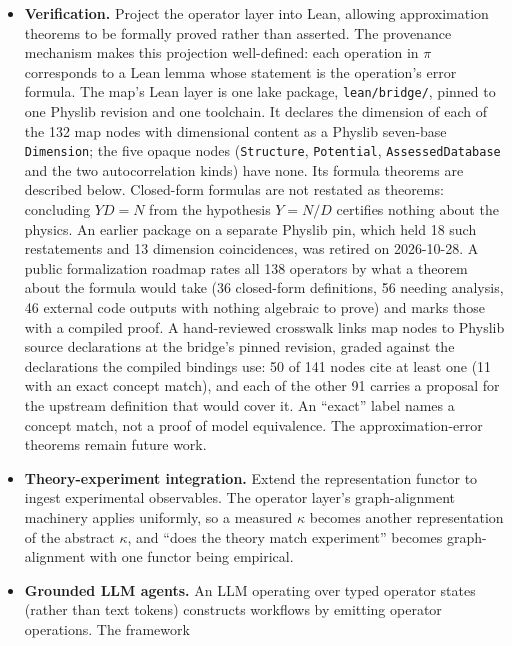 \documentclass[11pt,a4paper]{article}
\begin{document}
\begin{itemize}[leftmargin=2em]
  \item \textbf{Verification.} Project the operator layer into Lean, allowing
        approximation theorems to be formally proved rather than asserted. The
        provenance mechanism makes this projection well-defined: each operation in $\pi$
        corresponds to a Lean lemma whose statement is the operation's error formula.
        The map's Lean layer is one lake package, \texttt{lean/bridge/}, pinned to
        one Physlib revision and one toolchain. It declares the dimension of each of
        the 132 map nodes with dimensional content as a Physlib seven-base
        \texttt{Dimension}; the five opaque nodes (\texttt{Structure},
        \texttt{Potential}, \texttt{AssessedDatabase} and the two autocorrelation
        kinds) have none. Its formula theorems are described below. Closed-form
        formulas are not restated as theorems: concluding $YD = N$ from the
        hypothesis $Y = N/D$ certifies nothing about the physics. An earlier package
        on a separate Physlib pin, which held 18 such restatements and 13 dimension
        coincidences, was retired on 2026-10-28. A public formalization roadmap rates
        all 138 operators by what a theorem about the formula would take (36
        closed-form definitions, 56 needing analysis, 46 external code outputs with
        nothing algebraic to prove) and marks those with a compiled proof. A
        hand-reviewed crosswalk links map nodes to Physlib source declarations
        at the bridge's pinned revision, graded against the declarations the
        compiled bindings use: 50 of 141 nodes cite at least one (11 with an
        exact concept match), and each of the other 91 carries a proposal for
        the upstream definition that would cover it. An ``exact'' label names a
        concept match, not a proof of model equivalence. The
        approximation-error theorems remain future work.
  \item \textbf{Theory-experiment integration.} Extend the representation functor to ingest
        experimental observables. The operator layer's graph-alignment machinery applies uniformly,
        so a measured $\kappa$ becomes another representation of the abstract $\kappa$, and
        ``does the theory match experiment'' becomes graph-alignment with one functor being
        empirical.
  \item \textbf{Grounded LLM agents.} An LLM operating over typed operator states (rather than
        text tokens) constructs workflows by emitting operator operations. The framework

\end{itemize}
\end{document}
